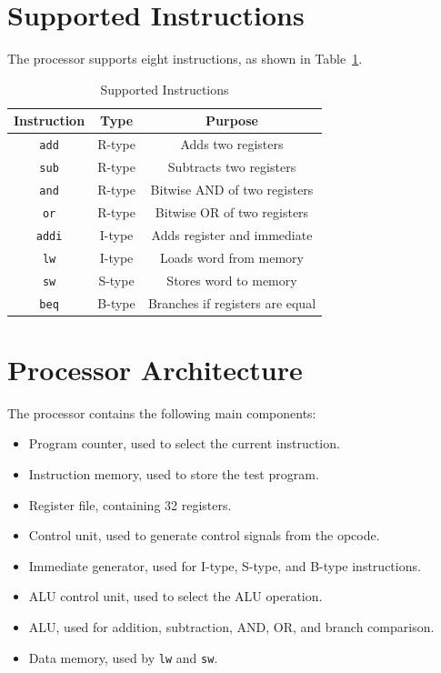 \documentclass[conference]{IEEEtran}
\begin{document}
\section{Supported Instructions}
The processor supports eight instructions, as shown in Table~\ref{tab:instructions}.

\begin{table}[h]
\centering
\caption{Supported Instructions}
\label{tab:instructions}
\begin{tabular}{|c|c|c|}
\hline
\textbf{Instruction} & \textbf{Type} & \textbf{Purpose} \\
\hline
\texttt{add} & R-type & Adds two registers \\
\texttt{sub} & R-type & Subtracts two registers \\
\texttt{and} & R-type & Bitwise AND of two registers \\
\texttt{or} & R-type & Bitwise OR of two registers \\
\texttt{addi} & I-type & Adds register and immediate \\
\texttt{lw} & I-type & Loads word from memory \\
\texttt{sw} & S-type & Stores word to memory \\
\texttt{beq} & B-type & Branches if registers are equal \\
\hline
\end{tabular}
\end{table}

\section{Processor Architecture}
The processor contains the following main components:

\begin{itemize}
    \item Program counter, used to select the current instruction.
    \item Instruction memory, used to store the test program.
    \item Register file, containing 32 registers.
    \item Control unit, used to generate control signals from the opcode.
    \item Immediate generator, used for I-type, S-type, and B-type instructions.
    \item ALU control unit, used to select the ALU operation.
    \item ALU, used for addition, subtraction, AND, OR, and branch comparison.
    \item Data memory, used by \texttt{lw} and \texttt{sw}.
\end{itemize}
\end{document}
